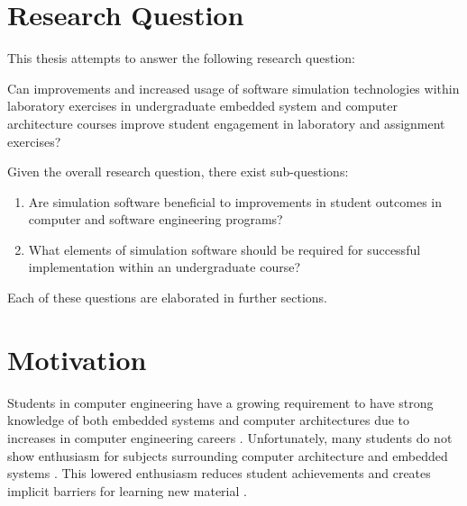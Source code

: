 \section{Research Question}

This thesis attempts to answer the following research question:
\begin{displayquote}
Can improvements and increased usage of software simulation technologies within laboratory exercises in undergraduate embedded system and computer architecture courses improve student engagement in laboratory and assignment exercises?
\end{displayquote}
Given the overall research question, there exist sub-questions: 
\begin{enumerate}
	\item Are simulation software beneficial to improvements in student outcomes in computer and software engineering programs?
	\item What elements of simulation software should be required for successful implementation within an undergraduate course?
\end{enumerate}
Each of these questions are elaborated in further sections. 

\section{Motivation}
\label{sec:motivation}

Students in computer engineering have a growing requirement to have strong knowledge of both embedded systems and computer architectures due to increases in computer engineering careers \cite{cec2016, bls2014}. Unfortunately, many students do not show enthusiasm for subjects surrounding computer architecture and embedded systems \cite{Ackovska2014,Ackovska2014,Stolikj2011}. This lowered enthusiasm reduces student achievements and creates implicit barriers for learning new material \cite{Ackovska2014, Ristov2011}.

